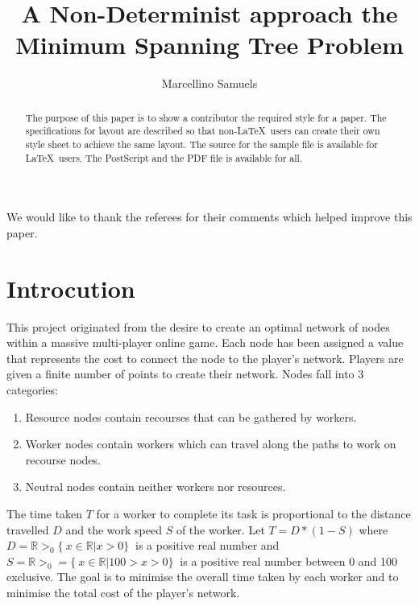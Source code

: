 \documentclass{AISB2008}
\begin{document}
\title{A Non-Determinist approach the Minimum Spanning Tree Problem}

\author{Marcellino Samuels }

\maketitle



\begin{abstract}
The purpose of this paper is to show a contributor the required
style for a paper. The specifications
for layout are described so that non-\LaTeX\ users can create their
own style sheet to achieve the same layout. The source for the
sample file is available for \LaTeX\ users. The PostScript and the
PDF file is available for all.
\end{abstract}

\ack
We would like to thank the referees for their comments which helped improve
this paper.

\tableofcontents

\section{Introcution}

This project originated from the desire to create an optimal network of nodes within a massive multi-player online game. Each node has been assigned a value that represents the cost to connect the node to the player’s network. Players are given a finite number of points to create their network. Nodes fall into 3 categories:

\begin{enumerate}
\item Resource nodes contain recourses that can be gathered by workers.
\item Worker nodes contain workers which can travel along the paths to work on recourse nodes.
\item Neutral nodes contain neither workers nor resources.
\end {enumerate}

The time taken {$T$} for a worker to complete its task is proportional to the distance travelled {$D$} and the work speed {$S$} of the worker. Let {$T = D * (1 - S)$} where {$D = {\mathbb{R}}>_0 \{\ x \in {\mathbb{R} | x > 0\}\ }$} is a positive real number and {$S = {\mathbb{R}}>_0 = \{\ x \in {\mathbb{R}} | 100 > x > 0 \}\  $} is a positive real number between 0 and 100 exclusive. The goal is to minimise the overall time taken by each worker and to minimise the total cost of the player’s network.
\end{document}
